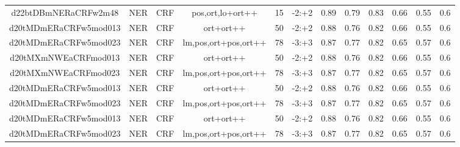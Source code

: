 \documentclass[a4paper]{article}
\begin{document}
\begin{landscape}
\begin{center}
\begin{tabular}{ |c|c|c|c|c|c|c|c|c|c|c|c|}
 	
 
 	
 		
 		\small{ d22btDBmNERaCRFw2m48 } & NER & CRF & pos,ort,lo+ort++  &  15 &  -2:+2  &  0.89 & 0.79 & 0.83  &  0.66 & 0.55 & 0.6 \\
 		

 	
 
 	
 		
 		\small{ d20tMDmERaCRFw5mod013 } & NER & CRF & ort+ort++  &  50 &  -2:+2  &  0.88 & 0.76 & 0.82  &  0.66 & 0.55 & 0.6 \\
 		

 	
 
 	
 		
 		\small{ d20tMDmERaCRFw5mod023 } & NER & CRF & lm,pos,ort+pos,ort++  &  78 &  -3:+3  &  0.87 & 0.77 & 0.82  &  0.65 & 0.57 & 0.6 \\
 		

 	
 
 	
 		
 		\small{ d20tMXmNWEaCRFmod013 } & NER & CRF & ort+ort++  &  50 &  -2:+2  &  0.88 & 0.76 & 0.82  &  0.66 & 0.55 & 0.6 \\
 		

 	
 
 	
 		
 		\small{ d20tMXmNWEaCRFmod023 } & NER & CRF & lm,pos,ort+pos,ort++  &  78 &  -3:+3  &  0.87 & 0.77 & 0.82  &  0.65 & 0.57 & 0.6 \\
 		

 	
 
 	
 		
 		\small{ d20tMDmERaCRFw5mod013 } & NER & CRF & ort+ort++  &  50 &  -2:+2  &  0.88 & 0.76 & 0.82  &  0.66 & 0.55 & 0.6 \\
 		

 	
 
 	
 		
 		\small{ d20tMDmERaCRFw5mod023 } & NER & CRF & lm,pos,ort+pos,ort++  &  78 &  -3:+3  &  0.87 & 0.77 & 0.82  &  0.65 & 0.57 & 0.6 \\
 		

 	
 
 	
 		
 		\small{ d20tMDmERaCRFw5mod013 } & NER & CRF & ort+ort++  &  50 &  -2:+2  &  0.88 & 0.76 & 0.82  &  0.66 & 0.55 & 0.6 \\
 		

 	
 
 	
 		
 		\small{ d20tMDmERaCRFw5mod023 } & NER & CRF & lm,pos,ort+pos,ort++  &  78 &  -3:+3  &  0.87 & 0.77 & 0.82  &  0.65 & 0.57 & 0.6 \\
 		


\end{tabular}
\end{center}
\end{landscape}
\end{document}

